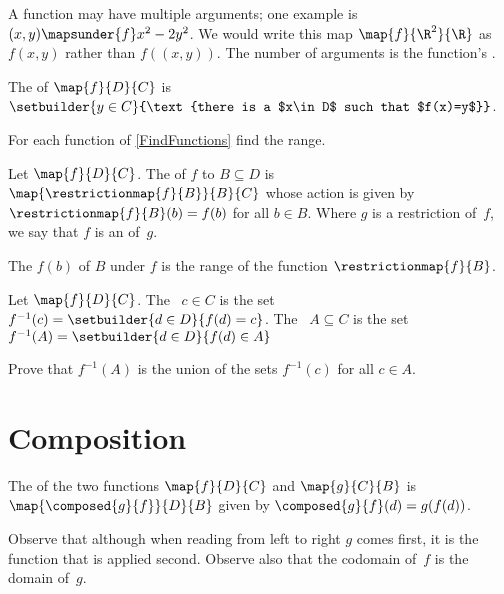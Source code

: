 \documentclass{ibl}
\begin{document}
A function may have multiple arguments; one example is 
$(x,y)\mapsunder{f}x^2-2y^2$.
We would write this map $\map{f}{\R^2}{\R}$ as 
$f(x,y)$ rather than
$f((x,y))$.
The number of arguments is the function's .

\begin{df}
The  of $\map{f}{D}{C}$
is $\setbuilder{y\in C}{\text{there is a $x\in D$ such that $f(x)=y$}}$.
\end{df}

\begin{ex}
For each function of \cref{FindFunctions} find the range.  
\end{ex}

\begin{df}
Let $\map{f}{D}{C}$.
The  of $f$ to $B\subseteq D$ is
$\map{\restrictionmap{f}{B}}{B}{C}$ whose action is given by 
$\restrictionmap{f}{B}(b)=f(b)$ for all $b\in B$.
Where $g$ is a restriction of~$f$, we say that
$f$ is an  of~$g$.

The  $f(b)$ of $B$ under $f$ is the range of 
the function $\restrictionmap{f}{B}$.
\end{df}

\begin{df}
Let $\map{f}{D}{C}$.
The ~$c\in C$ is
the set $f^{-1}(c)=\setbuilder{d\in D}{f(d)=c}$.
The ~$A\subseteq C$
is the set $f^{-1}(A)=\setbuilder{d\in D}{f(d)\in A}$   
\end{df}

\begin{ex}
Prove that $f^{-1}(A)$ is the union of the sets $f^{-1}(c)$ for all $c\in A$.
\end{ex}





\section{Composition}

\begin{df}
The  of
the two functions
$\map{f}{D}{C}$ and $\map{g}{C}{B}$ 
is $\map{\composed{g}{f}}{D}{B}$ given by 
$\composed{g}{f}(d)=g(f(d))$.
\end{df}

Observe that although when reading from left to right $g$ comes first, 
it is the function that is applied second. 
Observe also that the codomain of~$f$ is the domain of~$g$.
\end{document}
